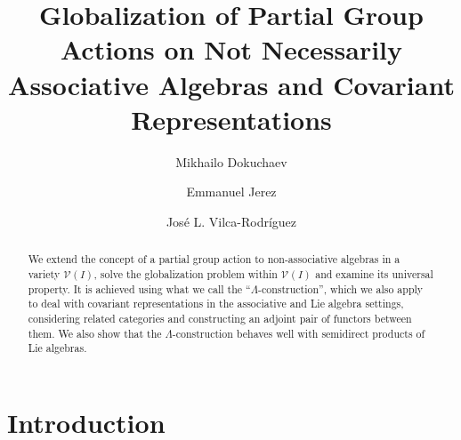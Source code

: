 \documentclass[11pt]{amsart}
\title[Globalization of Partial group actions on non-associative algebras]{Globalization of Partial Group Actions on Not Necessarily Associative Algebras and Covariant Representations}
\author{Mikhailo Dokuchaev}
\author{Emmanuel Jerez}
\author{José L. Vilca-Rodríguez}
\numberwithin{equation}{section}
\theoremstyle{definition}
\theoremstyle{remark}
\begin{document}
\begin{abstract}
     We extend the concept of a partial group action to non-associative algebras in a variety \(\mathcal{V}(I)\), solve the globalization problem  within \(\mathcal{V}(I)\) and examine its universal property. It is achieved
     using what we call the ``$\Lambda$-construction'', which we also apply to deal with covariant representations in the associative and Lie algebra settings, considering related categories and constructing an adjoint pair of functors between them.  We also show that the $\Lambda$-construction behaves well with semidirect products of Lie algebras.
\end{abstract}

\maketitle

\tableofcontents

\section*{Introduction}
\end{document}
